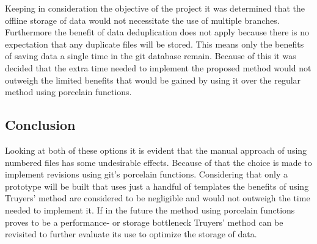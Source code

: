 Keeping in consideration the objective of the project it was determined that the offline storage of data would not necessitate the use of multiple branches.
Furthermore the benefit of data deduplication does not apply because there is no expectation that any duplicate files will be stored.
This means only the benefits of saving data a single time in the git database remain.
Because of this it was decided that the extra time needed to implement the proposed method would not outweigh the limited benefits that would be gained by using it over the regular method using porcelain functions.

\subsection{Conclusion}
Looking at both of these options it is evident that the manual approach of using numbered files has some undesirable effects.
Because of that the choice is made to implement revisions using git's porcelain functions.
Considering that only a prototype will be built that uses just a handful of templates the benefits of using Truyers' method are considered to be negligible and would not outweigh the time needed to implement it.
If in the future the method using porcelain functions proves to be a performance- or storage bottleneck Truyers' method can be revisited to further evaluate its use to optimize the storage of data.
